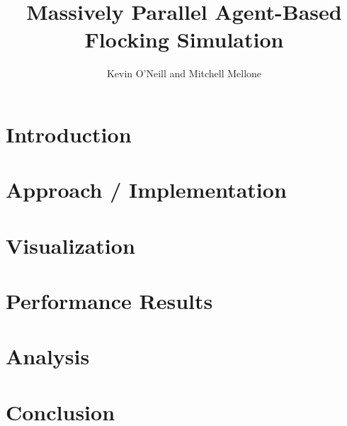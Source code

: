 \documentclass[10pt, twocolumn]{article}
\title{Massively Parallel Agent-Based Flocking Simulation}
\author{Kevin O'Neill and Mitchell Mellone}
\date{}
\begin{document}
\maketitle

\begin{abstract}
  
\end{abstract}

\section*{Introduction}


\section*{Approach / Implementation}


\section*{Visualization}


\section*{Performance Results}
\FloatBarrier

\FloatBarrier

\section*{Analysis}


\section*{Conclusion}


\printbibliography[title=References]
\end{document}
